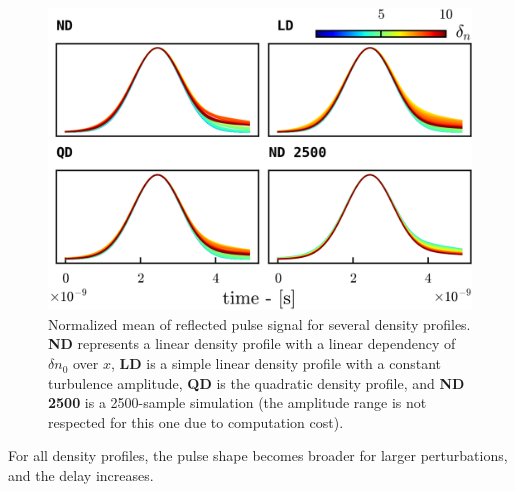 \documentclass[11pt,a4paper,openany]{report}
\begin{document}
\begin{multicols}{2}
    \begin{figure}[H]
        \centering
        \includegraphics[width=1\linewidth]{./figures/pulse_shape.png}
        \caption{Normalized mean of reflected pulse signal for several density profiles. \textbf{ND} represents a linear density profile with a linear dependency of $\delta n_0$ over $x$, \textbf{LD} is a simple linear density profile with a constant turbulence amplitude, \textbf{QD} is the quadratic density profile, and \textbf{ND 2500} is a 2500-sample simulation (the amplitude range is not respected for this one due to computation cost).}

        \label{fig:barrier}
    \end{figure}
    For all density profiles, the pulse shape becomes broader for larger perturbations, and the delay increases.


\end{multicols}
\end{document}
